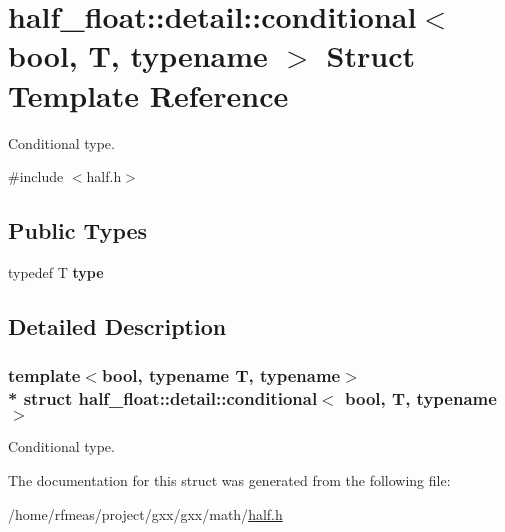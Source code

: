 \hypertarget{structhalf__float_1_1detail_1_1conditional}{}\section{half\+\_\+float\+:\+:detail\+:\+:conditional$<$ bool, T, typename $>$ Struct Template Reference}
\label{structhalf__float_1_1detail_1_1conditional}


Conditional type.  




{\ttfamily \#include $<$half.\+h$>$}

\subsection*{Public Types}
\begin{DoxyCompactItemize}
\item 
typedef T {\bfseries type}\hypertarget{structhalf__float_1_1detail_1_1conditional_ace7680db9fa44adf899e0133f39a43b6}{}\label{structhalf__float_1_1detail_1_1conditional_ace7680db9fa44adf899e0133f39a43b6}

\end{DoxyCompactItemize}


\subsection{Detailed Description}
\subsubsection*{template$<$bool, typename T, typename$>$\\*
struct half\+\_\+float\+::detail\+::conditional$<$ bool, T, typename $>$}

Conditional type. 

The documentation for this struct was generated from the following file\+:\begin{DoxyCompactItemize}
\item 
/home/rfmeas/project/gxx/gxx/math/\hyperlink{half_8h}{half.\+h}\end{DoxyCompactItemize}

